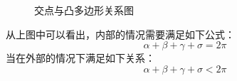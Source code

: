 \documentclass[10pt]{article}
\begin{document}
\begin{itemize}
\begin{figure}[H]
\begin{center}
\hspace{20pt}
\caption{交点与凸多边形关系图}
\end{center}
\end{figure}
\end{itemize}
从上图中可以看出，内部的情况需要满足如下公式：
$$\alpha+\beta+\gamma+\sigma=2\pi$$
当在外部的情况下满足如下关系：
$$\alpha+\beta+\gamma+\sigma < 2\pi$$
\end{document}
